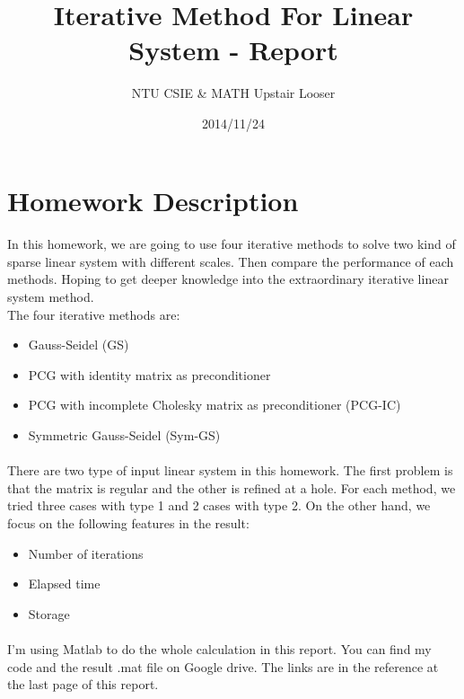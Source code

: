 \documentclass{article}
\begin{document}
\title{Iterative Method For Linear System - Report}
\author{NTU CSIE \& MATH Upstair Looser}
\date{2014/11/24}
\maketitle

\section{Homework Description}
\paragraph{}
In this homework, we are going to use four iterative methods to solve two kind of sparse linear system with different scales. Then compare the performance of each methods. Hoping to get deeper knowledge into the extraordinary iterative linear system method.\\
\indent The four iterative methods are:
\begin{itemize}
\item Gauss-Seidel (GS)
\item PCG with identity matrix as preconditioner
\item PCG with incomplete Cholesky matrix as preconditioner (PCG-IC)
\item Symmetric Gauss-Seidel (Sym-GS)
\end{itemize}

\paragraph{}
There are two type of input linear system in this homework. The first problem is that the matrix is regular and the other is refined at a hole. For each method, we tried three cases with type 1 and 2 cases with type 2. On the other hand, we focus on the following features in the result:
\begin{itemize}
\item Number of iterations
\item Elapsed time
\item Storage
\end{itemize}

\paragraph{}
I'm using Matlab to do the whole calculation in this report. You can find my code and the result .mat file on Google drive. The links are in the reference at the last page of this report\cite{Code}.
\end{document}
